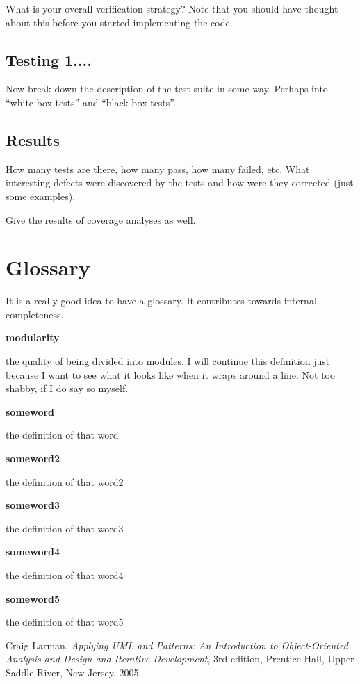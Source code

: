 \documentclass[11pt]{report}
\newlength{\glosslen}
\newcommand{\gloss}[2]{
  \vspace{3mm}

  \noindent\textbf{#1}\vspace{1mm}

  \hspace{5mm}\parbox{\glosslen}{#2}}
\begin{document}
What is your overall verification strategy?   Note that you should
have thought about this before you started implementing the code.

\section{Testing 1....}

Now break down the description of the test suite in some way.
Perhaps into ``white box tests'' and ``black box tests''.

\section{Results}

How many tests are there, how many pass, how many failed, etc.
What interesting defects were discovered by the tests and 
how were they corrected (just some examples).

Give the results of coverage analyses as well.

\appendix

\chapter{Glossary}

It is a really good idea to have a glossary.  It contributes towards
internal completeness.

\gloss{modularity}{the quality of being divided into modules.  I will
  continue this definition just because I want to see what it looks
  like when it wraps around a line.  Not too shabby, if I do say so
  myself.}

\gloss{someword}{the definition of that word}

\gloss{someword2}{the definition of that word2}

\gloss{someword3}{the definition of that word3}

\gloss{someword4}{the definition of that word4}

\gloss{someword5}{the definition of that word5}

\begin{thebibliography}{9}

 Craig Larman, \emph{Applying UML and Patterns: An
    Introduction to Object-Oriented Analysis and Design and Iterative
    Development}, 3rd edition, Prentice Hall, Upper Saddle River, New
  Jersey, 2005.
  
\end{thebibliography}
\end{document}
